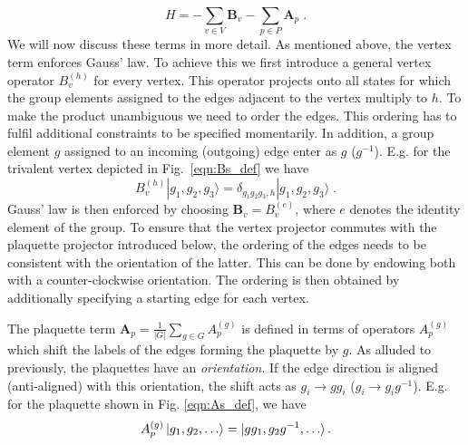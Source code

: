 \documentclass[two column]{article}
\begin{document}
\begin{equation}
    H = -  \sum_{v \in V} \mathbf B_v -  \sum_{p  \in  P} \mathbf A_p \label{eqn:ham} \;.
\end{equation}
We will now discuss these terms in more detail. As mentioned above, the vertex term enforces Gauss' law. To achieve this we first introduce a general vertex operator $B_v^{(h)}$ for every vertex. This operator projects onto all states for which the group elements assigned to the edges adjacent to the vertex multiply to $h$. To make the product unambiguous we need to order the edges. This ordering has to fulfil additional constraints to be specified momentarily. In addition, a group element $g$ assigned to an incoming (outgoing) edge enter as $g$ ($g^{-1}$). E.g. for the trivalent vertex depicted in Fig.~\ref{eqn:Bs_def} we have 
\begin{equation}
B_v^{(h)} |g_1,g_2,g_3\rangle= \delta_{g_1 g_2 g_3,h} |g_1,g_2,g_3\rangle \;.	
\end{equation}
Gauss' law is then enforced by choosing $\mathbf B_v=B^{(e)}_v$, where $e$ denotes the identity element of the group. To ensure that the vertex projector commutes with the plaquette projector introduced below, the ordering of the edges needs to be consistent with the orientation of the latter. This can be done by endowing both with a counter-clockwise orientation. The ordering is then obtained by additionally specifying a starting edge for each vertex.

The plaquette term 
	$\mathbf A_p=\frac{1}{|G|} \sum_{g \in G} A^{(g)}_p$
is defined in terms of operators $A^{(g)}_p$ which shift the labels of the edges forming the plaquette by $g$. As alluded to previously, the plaquettes have an \emph{orientation}. If the edge direction is aligned (anti-aligned) with this orientation, the shift acts as $g_i \rightarrow gg_i$ ($g_i \rightarrow g_ig^{-1}$). E.g. for the plaquette shown in Fig. \ref{eqn:As_def}, we have 
\begin{equation}
	A_p^{(g)}\ket{g_1, g_2, \ldots} = \ket{gg_1, g_2g^{-1}, \ldots}.
\end{equation} 
\end{document}
